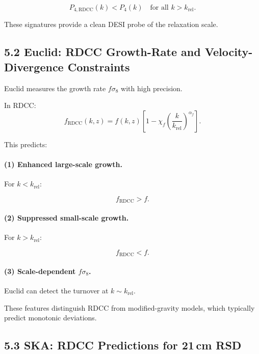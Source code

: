 \documentclass[11pt,a4paper]{article}
\begin{document}
\[
P_{4,\mathrm{RDCC}}(k)
<
P_{4}(k)
\quad \text{for all } k > k_{\mathrm{rel}}.
\]



These signatures provide a clean DESI probe of the relaxation scale.

\subsection{5.2 Euclid: RDCC Growth-Rate and Velocity-Divergence Constraints}

Euclid measures the growth rate $f\sigma_{8}$ with high precision.

In RDCC:
\begin{equation}
f_{\mathrm{RDCC}}(k,z)
=
f(k,z)
\left[
1
-
\chi_{f}
\left(
\frac{k}{k_{\mathrm{rel}}}
\right)^{\alpha_{f}}
\right].
\end{equation}

This predicts:

\paragraph{(1) Enhanced large-scale growth.}
For $k < k_{\mathrm{rel}}$:


\[
f_{\mathrm{RDCC}} > f.
\]



\paragraph{(2) Suppressed small-scale growth.}
For $k > k_{\mathrm{rel}}$:


\[
f_{\mathrm{RDCC}} < f.
\]



\paragraph{(3) Scale-dependent $f\sigma_{8}$.}
Euclid can detect the turnover at $k \sim k_{\mathrm{rel}}$.

These features distinguish RDCC from modified-gravity models, which typically predict
monotonic deviations.

\subsection{5.3 SKA: RDCC Predictions for 21\texorpdfstring{\,}{ }cm RSD}
\end{document}
